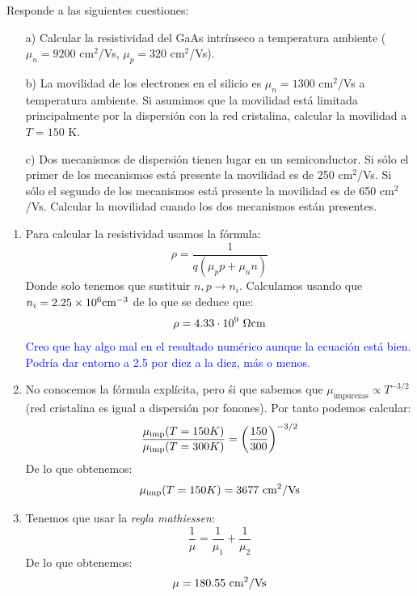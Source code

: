 \begin{texercise}
	Responde a las siguientes cuestiones:
	\begin{enumerate}
		\item[a)] Calcular la resistividad del GaAs intrínseco a temperatura ambiente ($\mu_n = 9200$ cm$^2$/Vs, $\mu_p = 320$ cm$^2$/Vs).

		\item[b)] La movilidad de los electrones en el silicio es $\mu_n = 1300$ cm$^2$/Vs a temperatura ambiente. Si asumimos que la movilidad está limitada principalmente por la dispersión con la red cristalina, calcular la movilidad a $T= 150$ K.

		\item[c)] Dos mecanismos de dispersión tienen lugar en un semiconductor. Si sólo el primer de los mecanismos está presente la movilidad es de 250 cm$^2$/Vs. Si sólo el segundo de los mecanismos está presente la movilidad es de 650 cm$^2$/Vs. Calcular la movilidad cuando los dos mecanismos están presentes.
	\end{enumerate}

	\tcblower
	\begin{enumerate}[label=\alph*)]
		\item Para calcular la resistividad usamos la fórmula:
		\begin{equation}
			\rho = \frac{1}{q(\mu_p p + \mu_n n )}
		\end{equation}
		Donde solo tenemos que sustituir $n,p\rightarrow n_i$. Calculamos usando que $n_i= 2.25\times 10^6 \text{cm}^{-3}$ de lo que se deduce que:
		\begin{equation}
		\rho =4.33\cdot 10^9 \ \Omega \text{cm}
		\end{equation}
		\textcolor{Blue}{Creo que hay algo mal en el resultado numérico aunque la ecuación está bien. Podría dar entorno a 2.5 por diez a la diez, más o menos.}
		\item No conocemos la fórmula explícita, pero śi que sabemos que $\mu_{\text{impurezas}}\propto T^{-3/2}$ (red cristalina es igual a dispersión por fonones). Por tanto podemos calcular:
		\begin{equation}
			\frac{\mu_{\text{imp}} (T=150K)}{\mu_{\text{imp}}(T=300K)} = \left( \frac{150}{300} \right)^{-3/2}		
		\end{equation}
		De lo que obtenemos:
		\begin{equation}
			\mu_{\text{imp}} (T=150K) = 3677 \ \text{cm}^2 / \text{Vs}
		\end{equation}
		\item Tenemos que usar la \textit{regla mathiessen}:
		\begin{equation}
			\frac{1}{\mu} = \frac{1}{\mu_{1}}+\frac{1}{\mu_{2}} 
		\end{equation}
		De lo que obtenemos:		
		\begin{equation}
			\mu = 180.55 \ \text{cm}^2 / \text{Vs} 
		\end{equation}
	\end{enumerate}
\end{texercise}






